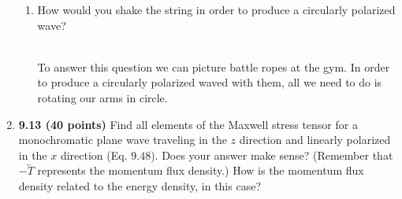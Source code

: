 \documentclass[fleqn]{article}
\begin{document}
\begin{enumerate}
\begin{enumerate}
      \item How would you shake the string in order to produce a circularly polarized wave?
      
        \textcolor{hwColor}{
          \\
          To answer this question we can picture battle ropes at the gym. In order to produce a circularly polarized waved with them, all we
          need to do is rotating our arms in circle.
          \\
        }

    \end{enumerate}

    \pagebreak

    \item \textbf{9.13 (40 points)} Find all elements of the Maxwell stress tensor for a monochromatic plane wave traveling in the 
    $z$ direction and linearly polarized in the $x$ direction (Eq. $9.48$). Does your answer make sense? (Remember that 
    $-\overleftrightarrow{T}$ represents the momentum flux density.) How is the momentum flux density related to the energy
    density, in this case?


\end{enumerate}
\end{document}
